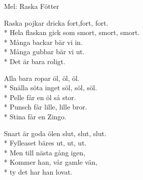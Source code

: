 \begin{SongText}[Sittningsvisa]
    \begin{SongInfo}
        Mel: Raska Fötter
    \end{SongInfo}
    \begin{SongVerse}
        Raska pojkar dricka fort,fort, fort.\\*%
        Hela flaskan gick som smort, smort, smort.\\*%
        Många backar bär vi in.\\*%
        Många gubbar bär vi ut.\\*%
        Det är bara roligt.
    \end{SongVerse}
    \begin{SongVerse}
        Alla bara ropar öl, öl, öl.\\*%
        Snälla söta inget söl, söl, söl.\\*%
        Pelle får en öl så stor.\\*%
        Punsch får lille, lille bror.\\*%
        Stina får en Zingo.
    \end{SongVerse}
    \begin{SongVerse}
        Snart är goda ölen slut, slut, slut.\\*%
        Fylleaset bäres ut, ut, ut.\\*%
        Men till nästa gång igen,\\*%
        Kommer han, vår gamle vän,\\*%
        ty det har han lovat.
    \end{SongVerse}
\end{SongText}

